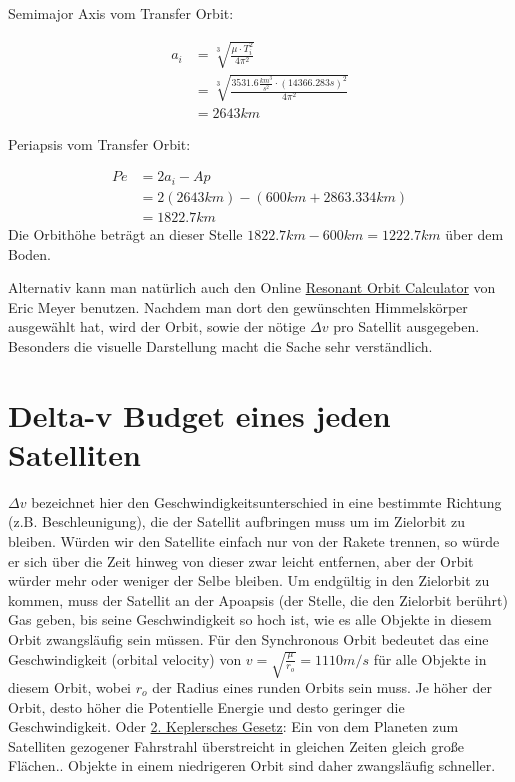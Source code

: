 \documentclass[12pt,paper=A4,numbers=noenddot,bibliography=totoc,listof=totoc,DIV=11,BCOR=1mm]{scrreprt}
\newcommand{\gq}[1]{\glqq #1\grqq} %
\begin{document}
\begin{flushleft}
Semimajor Axis vom Transfer Orbit:
\end{flushleft}
\begin{equation}
\begin{split}
a_{i} &= \sqrt[3]{\frac{\mu \cdot T_{i}^{2}}{4\pi^{2}}} \\
   &= \sqrt[3]{\frac{3531.6 \frac{km^{3}}{s^{2}} \cdot (14366.283s)^{2}}{4\pi^{2}}} \\
   &= 2643km
\end{split}
\end{equation}

\begin{flushleft}
Periapsis vom Transfer Orbit:
\end{flushleft}
\begin{equation}
\begin{split}
Pe &= 2a_{i} - Ap \\
   &= 2(2643km) - (600km + 2863.334km) \\
   &= 1822.7km
\end{split} 
\end{equation}
Die Orbithöhe beträgt an dieser Stelle $1822.7km - 600km = 1222.7km$ über dem Boden.

\bigskip
Alternativ kann man natürlich auch den Online \href{https://meyerweb.com/eric/ksp/resonant-orbits/}{Resonant Orbit Calculator} von Eric Meyer benutzen. Nachdem man dort den gewünschten Himmelskörper ausgewählt hat, wird der Orbit, sowie der nötige $\Delta v$ pro Satellit ausgegeben. Besonders die visuelle Darstellung macht die Sache sehr verständlich.

\section{Delta-v Budget eines jeden Satelliten}
$\Delta v$ bezeichnet hier den Geschwindigkeitsunterschied in eine bestimmte Richtung (z.B. Beschleunigung), die der Satellit aufbringen muss um im Zielorbit zu bleiben. Würden wir den Satellite einfach nur von der Rakete trennen, so würde er sich über die Zeit hinweg von dieser zwar leicht entfernen, aber der Orbit würder mehr oder weniger der Selbe bleiben. Um endgültig in den Zielorbit zu kommen, muss der Satellit an der Apoapsis (der Stelle, die den Zielorbit berührt) Gas geben, bis seine Geschwindigkeit so hoch ist, wie es alle Objekte in diesem Orbit zwangsläufig sein müssen. Für den \gq{Synchronous Orbit} bedeutet das eine Geschwindigkeit (orbital velocity) von $v = \sqrt{\frac{\mu}{r_{o}}} = 1110m/s$ für alle Objekte in diesem Orbit, wobei $r_{o}$ der Radius eines runden Orbits sein muss. Je höher der Orbit, desto höher die Potentielle Energie und desto geringer die Geschwindigkeit. Oder \href{https://de.wikipedia.org/wiki/Keplersche_Gesetze}{2. Keplersches Gesetz}: \gq{Ein von dem Planeten zum Satelliten gezogener Fahrstrahl überstreicht in gleichen Zeiten gleich große Flächen.}. Objekte in einem niedrigeren Orbit sind daher zwangsläufig schneller.\\
\end{document}
